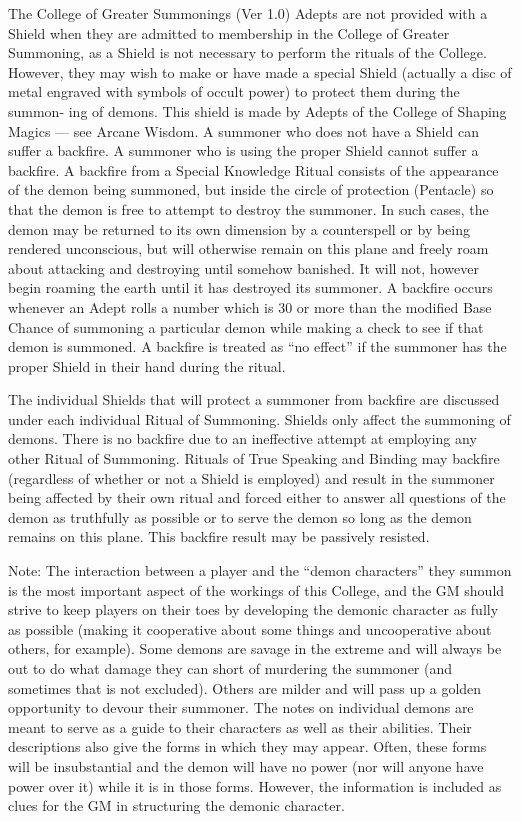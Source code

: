 \begin{Chapter}{The College of Greater Summonings (Ver 1.0)}
Adepts are not provided with a Shield when they are admitted to
membership in the College of Greater Summoning, as a Shield is not
necessary to perform the rituals of the College.  However, they may
wish to make or have made a special Shield (actually a disc of metal
engraved with symbols of occult power) to protect them during the
summon- ing of demons.  This shield is made by Adepts of the College
of Shaping Magics — see Arcane Wisdom. A summoner who does not have a
Shield can suffer a backfire.  A summoner who is using the proper
Shield cannot suffer a backfire.  A backfire from a Special Knowledge
Ritual consists of the appearance of the demon being summoned, but
inside the circle of protection (Pentacle) so that the demon is free
to attempt to destroy the summoner.  In such cases, the demon may be
returned to its own dimension by a counterspell or by being rendered
unconscious, but will otherwise remain on this plane and freely roam
about attacking and destroying until somehow banished.  It will not,
however begin roaming the earth until it has destroyed its summoner. A
backfire occurs whenever an Adept rolls a number which is 30 or more
than the modified Base Chance of summoning a particular demon while
making a check to see if that demon is summoned.  A backfire is
treated as “no effect” if the summoner has the proper Shield in their
hand during the ritual.

The individual Shields that will protect a summoner from backfire are
discussed under each individual Ritual of Summoning.  Shields only
affect the summoning of demons. There is no backfire due to an
ineffective attempt at employing any other Ritual of Summoning.
Rituals of True Speaking and Binding may backfire (regardless of
whether or not a Shield is employed) and result in the summoner being
affected by their own ritual and forced either to answer all questions
of the demon as truthfully as possible or to serve the demon so long
as the demon remains on this plane.  This backfire result may be
passively resisted.

Note: The interaction between a player and the “demon characters” they
summon is the most important aspect of the workings of this College,
and the GM should strive to keep players on their toes by developing
the demonic character as fully as possible (making it cooperative
about some things and uncooperative about others, for example).  Some
demons are savage in the extreme and will always be out to do what
damage they can short of murdering the summoner (and sometimes that is
not excluded). Others are milder and will pass up a golden opportunity
to devour their summoner. The notes on individual demons are meant to
serve as a guide to their characters as well as their abilities.
Their descriptions also give the forms in which they may appear.
Often, these forms will be insubstantial and the demon will have no
power (nor will anyone have power over it) while it is in those forms.
However, the information is included as clues for the GM in
structuring the demonic character.


\end{Chapter}
